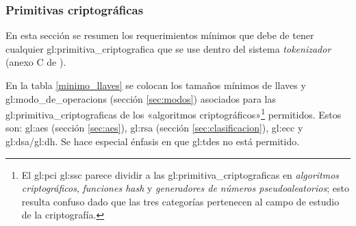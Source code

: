 %
%

\subsubsection{Primitivas criptográficas}
\label{sec:primitivas}

En esta sección se resumen los requerimientos mínimos que debe de tener
cualquier \gls{gl:primitiva_criptografica} que se use dentro del sistema
\textit{tokenizador} (anexo C de \cite{pci_tokens}).

En la tabla \ref{minimo_llaves} se colocan los tamaños mínimos de llaves y
\glspl{gl:modo_de_operacion} (sección \ref{sec:modos}) asociados
para las \glspl{gl:primitiva_criptografica} de los «algoritmos
criptográficos»\footnote{El \gls{gl:pci} \gls{gl:ssc} parece dividir a las
\glspl{gl:primitiva_criptografica} en \textit{algoritmos criptográficos},
\textit{funciones hash} y \textit{generadores de números pseudoaleatorios};
esto resulta confuso dado que las tres categorías pertenecen al campo de
estudio de la criptografía.} permitidos. Estos son: \gls{gl:aes} (sección
\ref{sec:aes}), \gls{gl:rsa} (sección \ref{sec:clasificacion}), \gls{gl:ecc} y
\gls{gl:dsa}/\gls{gl:dh}. Se hace especial énfasis en que \gls{gl:tdes} no
está permitido.



